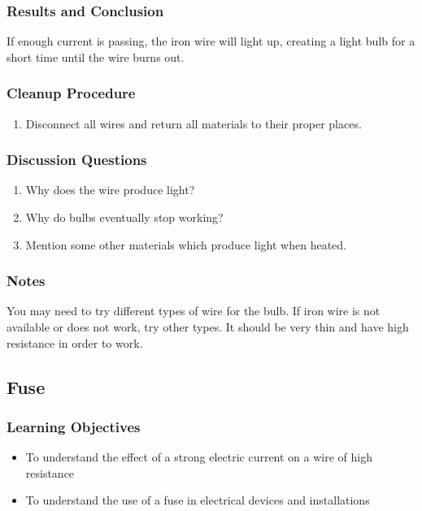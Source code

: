 \subsubsection*{Results and Conclusion}
If enough current is passing, the iron wire will light up, creating a light bulb for a short time until the
wire burns out.  

\subsubsection*{Cleanup Procedure}
\begin{enumerate}
\item{Disconnect all wires and return all materials to their proper places.}
\end{enumerate}

\subsubsection*{Discussion Questions}
\begin{enumerate}
\item{Why does the wire produce light?}
\item{Why do bulbs eventually stop working?}
\item{Mention some other materials which produce light when heated.}
\end{enumerate}

\subsubsection*{Notes}
You may need to try different types of wire for the bulb.  If iron wire is not available or does not work, try other types.  It should be very thin and have high resistance in order to work.

\subsection{Fuse}

\subsubsection*{Learning Objectives}
\begin{itemize}
\item{To understand the effect of a strong electric current on a wire of high resistance}
\item{To understand the use of a fuse in electrical devices and installations}
\end{itemize}

